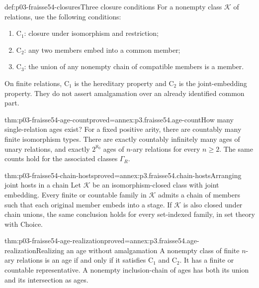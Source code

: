 \begin{hbdefinition}{def:p03-fraisse54-closures}{Three closure conditions}
For a nonempty class \(\mathcal K\) of relations, use the following conditions:
\begin{enumerate}
\item \(\mathrm C_1\): closure under isomorphism and restriction;
\item \(\mathrm C_2\): any two members embed into a common member;
\item \(\mathrm C_3\): the union of any nonempty chain of compatible
      members is a member.
\end{enumerate}
On finite relations, \(\mathrm C_1\) is the hereditary property and
\(\mathrm C_2\) is the joint-embedding property. They do not assert
amalgamation over an already identified common part.
\end{hbdefinition}

\begin{hbtheorem}{thm:p03-fraisse54-age-count}{proved=annex:p3.fraisse54.age-count}{How many single-relation ages exist?}
For a fixed positive arity, there are countably many finite isomorphism types.
There are exactly countably infinitely many ages of unary relations, and
exactly \(2^{\aleph_0}\) ages of \(n\)-ary relations for every \(n\geq2\).
The same counts hold for the associated classes \(\Gamma_R\).
\end{hbtheorem}

\begin{hblemma}{thm:p03-fraisse54-chain-hosts}{proved=annex:p3.fraisse54.chain-hosts}{Arranging joint hosts in a chain}
Let \(\mathcal K\) be an isomorphism-closed class with joint embedding.
Every finite or countable family in \(\mathcal K\) admits a chain of
members such that each original member embeds into a stage. If
\(\mathcal K\) is also closed under chain unions, the same conclusion
holds for every set-indexed family, in set theory with Choice.
\end{hblemma}

\begin{hbtheorem}{thm:p03-fraisse54-age-realization}{proved=annex:p3.fraisse54.age-realization}{Realizing an age without amalgamation}
A nonempty class of finite \(n\)-ary relations is an age if and only if it
satisfies \(\mathrm C_1\) and \(\mathrm C_2\). It has a finite or countable
representative. A nonempty inclusion-chain of ages has both its union and
its intersection as ages.
\end{hbtheorem}

